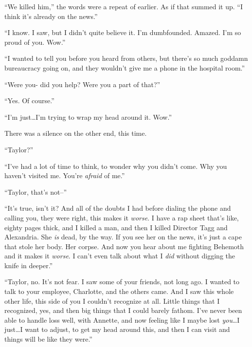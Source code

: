 ``We killed him,'' the words were a repeat of earlier.  As if that summed it up.  ``I think it's already on the news.''



``I know.  I saw, but I didn't quite believe it.  I'm dumbfounded.  Amazed.  I'm so proud of you.  Wow.''



``I wanted to tell you before you heard from others, but there's so much goddamn bureaucracy going on, and they wouldn't give me a phone in the hospital room.''



``Were you- did you help?  Were you a part of that?''



``Yes.  Of course.''



``I'm just\ldots I'm trying to wrap my head around it.  Wow.''



There was a silence on the other end, this time.



``Taylor?''



``I've had a lot of time to think, to wonder why you didn't come.  Why you haven't visited me.  You're \emph{afraid} of me.''



``Taylor, that's not--''



``It's true, isn't it?  And all of the doubts I had before dialing the phone and calling you, they were right, this makes it \emph{worse}.  I have a rap sheet that's like, eighty pages thick, and I killed a man, and then I killed Director Tagg and Alexandria.  She \emph{is} dead, by the way.  If you see her on the news, it's just a cape that stole her body.  Her corpse.  And now you hear about me fighting Behemoth and it makes it \emph{worse}.  I can't even talk about what I \emph{did} without digging the knife in deeper.''



``Taylor, no.  It's not fear.  I saw some of your friends, not long ago.  I wanted to talk to your employee, Charlotte, and the others came.  And I saw this whole other life, this side of you I couldn't recognize at all.  Little things that I recognized, yes, and then big things that I could barely fathom.  I've never been able to handle loss well, with Annette, and now feeling like I maybe lost \emph{you}\ldots  I just\ldots I want to adjust, to get my head around this, and then I can visit and things will be like they were.''



